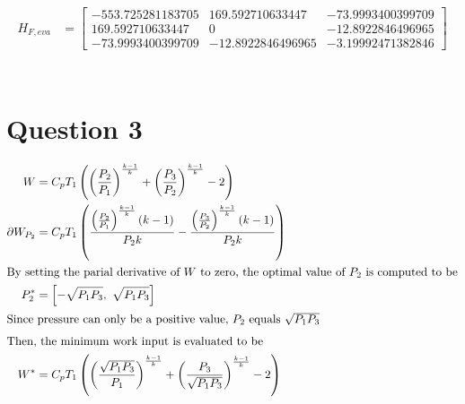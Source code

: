 \documentclass[a4paper,12pt]{article} %
\begin{document}
\begin{align*}
H_{F,eva} &= \left[\begin{matrix}-553.725281183705 & 169.592710633447 & -73.9993400399709\\169.592710633447 & 0 & -12.8922846496965\\-73.9993400399709 & -12.8922846496965 & -3.19992471382846\end{matrix}\right]\\
\end{align*}
\\


\section{\textbf{Question 3}}
\begin{align*}
W &=C_{p} T_{1} \left(\left(\frac{P_{2}}{P_{1}}\right)^{\frac{k - 1}{k}} + \left(\frac{P_{3}}{P_{2}}\right)^{\frac{k - 1}{k}} - 2\right)\\
\partial W_{P_2} &= C_{p} T_{1} \left(\frac{\left(\frac{P_{2}}{P_{1}}\right)^{\frac{k - 1}{k}} \left(k - 1\right)}{P_{2} k} - \frac{\left(\frac{P_{3}}{P_{2}}\right)^{\frac{k - 1}{k}} \left(k - 1\right)}{P_{2} k}\right)\\
\intertext{By setting the parial derivative of $W$ to zero, the optimal value of $P_2$ is computed to be}
P_2^* &= \left[ - \sqrt{P_{1} P_{3}}, \  \sqrt{P_{1} P_{3}}\right]\\
\intertext{Since pressure can only be a positive value, $P_2$ equals $\sqrt{P_{1} P_{3}}$ }
\intertext{Then, the minimum work input is evaluated to be}
W^* &= C_{p} T_{1} \left(\left(\frac{\sqrt{P_{1} P_{3}}}{P_{1}}\right)^{\frac{k - 1}{k}} + \left(\frac{P_{3}}{\sqrt{P_{1} P_{3}}}\right)^{\frac{k - 1}{k}} - 2\right)
\end{align*}
\end{document}
